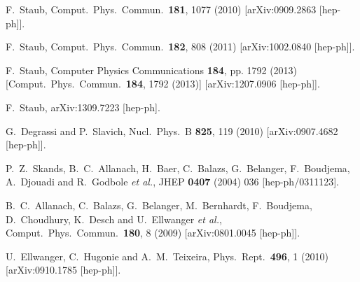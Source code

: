 \documentclass[final,3p,times,pdflatex]{elsarticle}
\begin{document}
\begin{thebibliography}{100}
  F.~Staub,
  Comput.\ Phys.\ Commun.\  {\bf 181}, 1077 (2010)
  [arXiv:0909.2863 [hep-ph]].

  F.~Staub,
  Comput.\ Phys.\ Commun.\  {\bf 182}, 808 (2011)
  [arXiv:1002.0840 [hep-ph]].

  F.~Staub,
  Computer Physics Communications {\bf 184}, pp. 1792 (2013)
  [Comput.\ Phys.\ Commun.\  {\bf 184}, 1792 (2013)]
  [arXiv:1207.0906 [hep-ph]].

  F.~Staub,
  arXiv:1309.7223 [hep-ph].

  G.~Degrassi and P.~Slavich,
  Nucl.\ Phys.\ B {\bf 825}, 119 (2010)
  [arXiv:0907.4682 [hep-ph]].

  P.~Z.~Skands, B.~C.~Allanach, H.~Baer, C.~Balazs, G.~Belanger, F.~Boudjema, A.~Djouadi and R.~Godbole {\it et al.},
  JHEP {\bf 0407} (2004) 036
  [hep-ph/0311123].

  B.~C.~Allanach, C.~Balazs, G.~Belanger, M.~Bernhardt, F.~Boudjema, D.~Choudhury, K.~Desch and U.~Ellwanger {\it et al.},
  Comput.\ Phys.\ Commun.\  {\bf 180}, 8 (2009)
  [arXiv:0801.0045 [hep-ph]].

  U.~Ellwanger, C.~Hugonie and A.~M.~Teixeira,
  Phys.\ Rept.\  {\bf 496}, 1 (2010)
  [arXiv:0910.1785 [hep-ph]].


\end{thebibliography}
\end{document}
